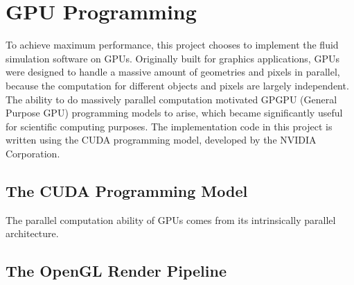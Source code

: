 \chapter{GPU Programming}

To achieve maximum performance, this project chooses to implement the fluid simulation software on GPUs. Originally built for graphics applications, GPUs were designed to handle a massive amount of geometries and pixels in parallel, because the computation for different objects and pixels are largely independent. The ability to do massively parallel computation motivated GPGPU (General Purpose GPU) programming models to arise, which became significantly useful for scientific computing purposes. The implementation code in this project is written using the CUDA programming model, developed by the NVIDIA Corporation.

\section{The CUDA Programming Model}
The parallel computation ability of GPUs comes from its intrinsically parallel architecture. 

\section{The OpenGL Render Pipeline}